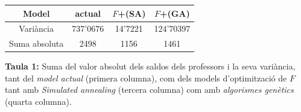 \documentclass[10pt,twocolumn]{article}
\begin{document}
\begin{tcolorbox}[colback=white,coltitle=black,colframe=white, colback=white]
{\centering
	\small
	\begin{tabular}{|c|c|c|c|}
	\hline
     \textbf{Model}&\textbf{actual}&\textbf{$F$+(SA)}&\textbf{$F$+(GA)}\\
     \hline
     Variància&737'0676&14'7221&124'70397\\
     \hline
     Suma absoluta&2498&1156&1461\\
     \hline
	\end{tabular}
}
\end{tcolorbox}
\noindent \textbf{Taula 1:} \small{Suma del valor absolut dels saldos dels professors  i la seva variància, tant del \textit{model actual} (primera columna), com dels models d'optimització de $F$ tant amb \textit{Simulated annealing} (tercera columna) com amb \textit{algorismes genètics} (quarta columna).}
\vspace{3mm}
\end{document}
